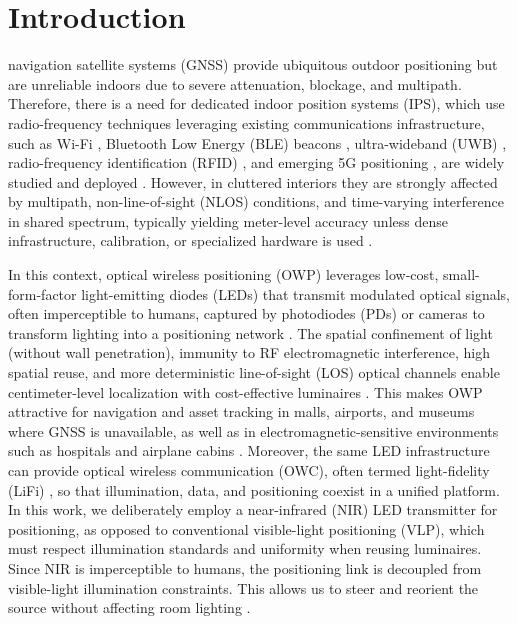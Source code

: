 \documentclass[journal]{IEEEtran}
\begin{document}
\section{Introduction}

 navigation satellite systems (GNSS) provide ubiquitous outdoor positioning but are unreliable indoors due to severe attenuation, blockage, and multipath. Therefore, there is a need for dedicated indoor position systems (IPS), which use radio-frequency techniques leveraging existing communications infrastructure, such as Wi-Fi \cite{He2016}, Bluetooth Low Energy (BLE) beacons \cite{Faragher2015}, ultra-wideband (UWB) \cite{Alarifi2016}, radio-frequency identification (RFID) \cite{Ni2004}, and emerging 5G positioning \cite{Italiano2025}, are widely studied and deployed \cite{Zafari2019, Italiano2025}. However, in cluttered interiors they are strongly affected by multipath, non-line-of-sight (NLOS) conditions, and time-varying interference in shared spectrum, typically yielding meter-level accuracy unless dense infrastructure, calibration, or specialized hardware is used \cite{Lymberopoulos2015, Leitch2023}.

In this context, optical wireless positioning (OWP) leverages low-cost, small-form-factor light-emitting diodes (LEDs) that transmit modulated optical signals, often imperceptible to humans, captured by photodiodes (PDs) or cameras to transform lighting into a positioning network \cite{Wang2024b}. 
The spatial confinement of light (without wall penetration), immunity to RF electromagnetic interference, high spatial reuse, and more deterministic line-of-sight (LOS) optical channels enable centimeter-level localization with cost-effective luminaires \cite{Trevlakis2023}. This makes OWP attractive for navigation and asset tracking in malls, airports, and museums where GNSS is unavailable, as well as in electromagnetic-sensitive environments such as hospitals and airplane cabins \cite{Wang2024b}. 
Moreover, the same LED infrastructure can provide optical wireless communication (OWC), often termed light-fidelity (LiFi) \cite{Haas:16}, so that illumination, data, and positioning coexist in a unified platform. 
In this work, we deliberately employ a near-infrared (NIR) LED transmitter for positioning, as opposed to conventional visible-light positioning (VLP), which must respect illumination standards and uniformity when reusing luminaires. 
Since NIR is imperceptible to humans, the positioning link is decoupled from visible-light illumination constraints. This allows us to steer and reorient the source without affecting room lighting \cite{Zhu2025}.
\end{document}

